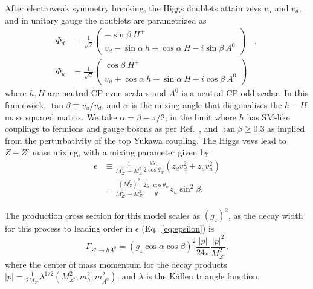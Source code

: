  After electroweak symmetry breaking, the Higgs doublets attain vevs $v_u$ and $v_d$, and in unitary gauge the doublets are parametrized as
 \begin{align}
 \Phi_d &= \frac{1}{\sqrt{2}}
 \begin{pmatrix}
 -\sin{\beta} \ H^+ \\ v_d - \sin{\alpha} \ h + \cos{\alpha} \ H - i \sin{\beta} \ A^0
 \end{pmatrix} 
 \quad , \nonumber \\
 \Phi_u &= \frac{1}{\sqrt{2}}
 \begin{pmatrix}
 \cos{\beta} \ H^+ \\ v_u + \cos{\alpha} \ h + \sin{\alpha} \ H + i \cos{\beta} \ A^0
 \end{pmatrix}
 \end{align}
 where $h,H$ are neutral CP-even scalars and $A^0$ is a neutral CP-odd scalar. 
 In this framework, $\tan{\beta} \equiv v_u/v_d$, and $\alpha$ is the mixing angle that diagonalizes 
 the $h - H$ mass squared matrix. 
We take $\alpha = \beta - \pi/2$, in the 
limit where $h$ has SM-like couplings to fermions and 
gauge bosons as per Ref.~\cite{Craig:2013hca}, and $\tan{\beta} \ge 0.3$ 
as implied from the perturbativity of the top Yukawa coupling. 
The Higgs vevs lead to $Z-Z'$ mass mixing, with a mixing parameter given by 
 \begin{align}
 \epsilon & \equiv \frac{1}{M_{Z'}^2 - M_Z^2} \frac{g g_z}{2 \cos{\theta_w}} ( z_d v_d^2 + z_u v_u^2) \nonumber \\
 & =  \frac{(M_Z^0)^2}{M_{Z'}^2 - M_Z^2} \frac{2 g_z \cos \theta_w}{g}  z_u \sin^2 \beta.
 \label{eq:epsilon}
 \quad
 \end{align}
  
The production cross section for this model scales as $(g_z)^2$, as the decay width for this process
to leading order in $\epsilon$ (Eq.~\ref{eq:epsilon}) is
\begin{equation}
\Gamma_{Z' \to hA^0} =  (g_z \cos \alpha \cos \beta)^2 \frac{|p|}{24 \pi} \frac{|p|^2}{M_{Z'}^2}.
\end{equation}
where the center of mass momentum for the decay products $|p| =
\frac{1}{2 M_{Z'}} \lambda^{1/2}(M_{Z'}^2,m_h^2, m_{A^0}^2)$, and
$\lambda$ is the K\"{a}llen triangle function.  
   
